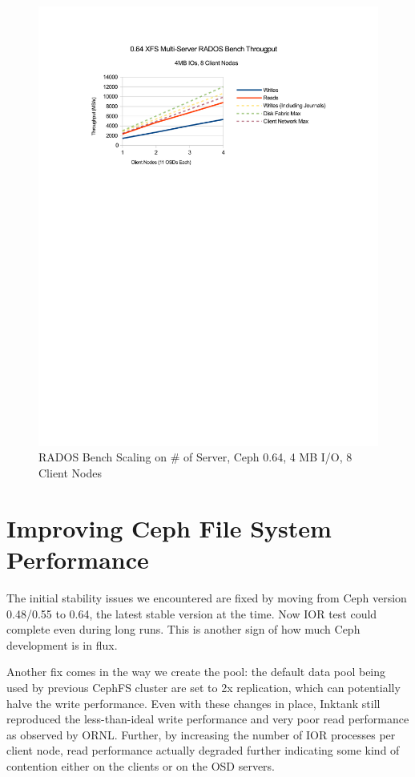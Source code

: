 \documentclass{article}
\begin{document}
\begin{figure}[htb]
\centering
\includegraphics[width=5in]{rados-064-oss}
\caption{RADOS Bench Scaling on \# of Server, Ceph 0.64, 4 MB I/O, 8 Client Nodes}
\label{fig:rados-064-oss}
\end{figure}



\section{Improving Ceph File System Performance}

The initial stability issues we encountered are fixed by moving 
from Ceph version 0.48/0.55 to 0.64, the latest stable version at the time. Now IOR test could
complete even during long runs. This is another sign of how much Ceph
development is in flux.

Another fix comes in the way we create the pool: the default data pool being used
by previous CephFS cluster are set to 2x replication, which can potentially
halve the write performance. Even with these changes in place, Inktank still
reproduced the less-than-ideal write performance and very poor read
performance as observed by ORNL.  Further, by increasing the number of IOR
processes per client node, read performance actually degraded further
indicating some kind of contention either on the clients or on the OSD
servers.
\end{document}
